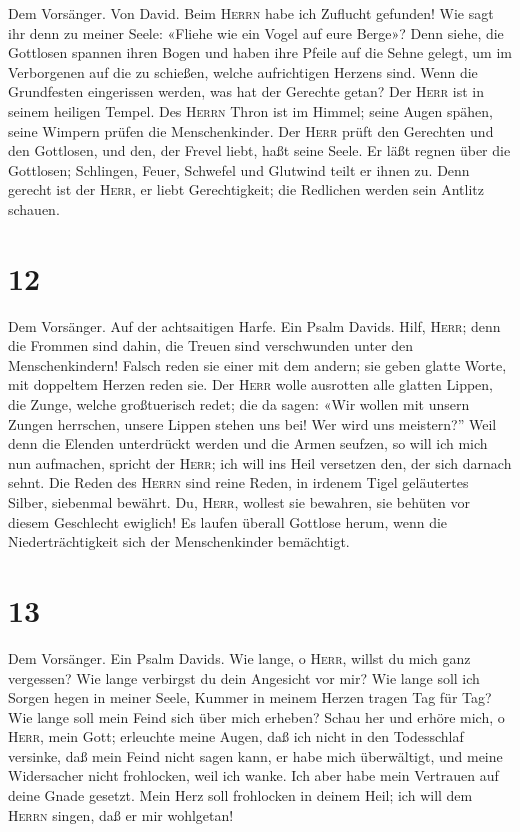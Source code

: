  Dem Vorsänger. Von David. Beim \textsc{Herrn} habe ich
Zuflucht gefunden! Wie sagt ihr denn zu meiner Seele: «Fliehe wie ein
Vogel auf eure Berge»?  Denn siehe, die Gottlosen spannen
ihren Bogen und haben ihre Pfeile auf die Sehne gelegt, um im
Verborgenen auf die zu schießen, welche aufrichtigen Herzens sind.
 Wenn die Grundfesten eingerissen werden, was hat der
Gerechte getan?  Der \textsc{Herr} ist in seinem heiligen
Tempel. Des \textsc{Herrn} Thron ist im Himmel; seine Augen spähen,
seine Wimpern prüfen die Menschenkinder.  Der
\textsc{Herr} prüft den Gerechten und den Gottlosen, und den, der Frevel
liebt, haßt seine Seele.  Er läßt regnen über die
Gottlosen; Schlingen, Feuer, Schwefel und Glutwind teilt er ihnen zu.
 Denn gerecht ist der \textsc{Herr}, er liebt
Gerechtigkeit; die Redlichen werden sein Antlitz schauen.

\hypertarget{section-11}{%
\section{12}\label{section-11}}

 Dem Vorsänger. Auf der achtsaitigen Harfe. Ein Psalm
Davids. Hilf, \textsc{Herr}; denn die Frommen sind dahin, die Treuen
sind verschwunden unter den Menschenkindern!  Falsch reden
sie einer mit dem andern; sie geben glatte Worte, mit doppeltem Herzen
reden sie.  Der \textsc{Herr} wolle ausrotten alle glatten
Lippen, die Zunge, welche großtuerisch redet;  die da
sagen: «Wir wollen mit unsern Zungen herrschen, unsere Lippen stehen uns
bei! Wer wird uns meistern?''  Weil denn die Elenden
unterdrückt werden und die Armen seufzen, so will ich mich nun
aufmachen, spricht der \textsc{Herr}; ich will ins Heil versetzen den,
der sich darnach sehnt.  Die Reden des \textsc{Herrn} sind
reine Reden, in irdenem Tigel geläutertes Silber, siebenmal bewährt.
 Du, \textsc{Herr}, wollest sie bewahren, sie behüten vor
diesem Geschlecht ewiglich!  Es laufen überall Gottlose
herum, wenn die Niederträchtigkeit sich der Menschenkinder bemächtigt.

\hypertarget{section-12}{%
\section{13}\label{section-12}}

 Dem Vorsänger. Ein Psalm Davids. Wie lange, o
\textsc{Herr}, willst du mich ganz vergessen? Wie lange verbirgst du
dein Angesicht vor mir?  Wie lange soll ich Sorgen hegen
in meiner Seele, Kummer in meinem Herzen tragen Tag für Tag? Wie lange
soll mein Feind sich über mich erheben?  Schau her und
erhöre mich, o \textsc{Herr}, mein Gott; erleuchte meine Augen, daß ich
nicht in den Todesschlaf versinke,  daß mein Feind nicht
sagen kann, er habe mich überwältigt, und meine Widersacher nicht
frohlocken, weil ich wanke.  Ich aber habe mein Vertrauen
auf deine Gnade gesetzt. Mein Herz soll frohlocken in deinem Heil;
 ich will dem \textsc{Herrn} singen, daß er mir wohlgetan!

